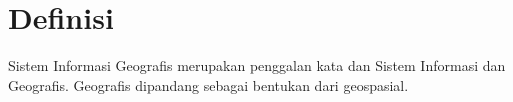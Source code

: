 \section{Definisi}
Sistem Informasi Geografis merupakan penggalan kata dan Sistem Informasi dan Geografis. Geografis dipandang sebagai bentukan dari geospasial.
